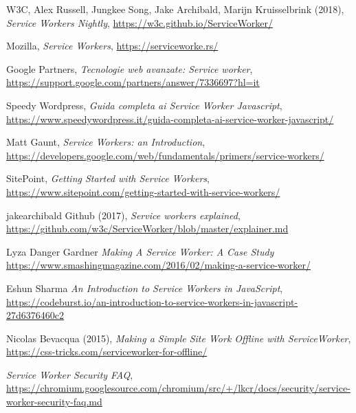 \documentclass[11pt ,a4paper , twoside , openright ]{article}
\begin{document}
\begin{thebibliography}{99}
	\bibitem{}
	W3C, Alex Russell, Jungkee Song, Jake Archibald, Marijn Kruisselbrink (2018),
	\emph{Service Workers Nightly},
	\url{https://w3c.github.io/ServiceWorker/}
	
	\bibitem{}
	Mozilla,
	\emph{Service Workers},
	\url{https://serviceworke.rs/}
	
	\bibitem{}
	Google Partners,
	\emph{Tecnologie web avanzate: Service worker},
	\url{https://support.google.com/partners/answer/7336697?hl=it}
	
	\bibitem{}
	Speedy Wordpress,
	\emph{Guida completa ai Service Worker Javascript},
	\url{https://www.speedywordpress.it/guida-completa-ai-service-worker-javascript/}
	
	\bibitem{}
	Matt Gaunt,
	\emph{Service Workers: an Introduction},
	\url{https://developers.google.com/web/fundamentals/primers/service-workers/}
	
	\bibitem{}
	SitePoint,
	\emph{Getting Started with Service Workers},
	\url{https://www.sitepoint.com/getting-started-with-service-workers/}
	
	\bibitem{}
	jakearchibald Github (2017),
	\emph{Service workers explained},
	\url{https://github.com/w3c/ServiceWorker/blob/master/explainer.md}
	
	\bibitem{}
	Lyza Danger Gardner
	\emph{Making A Service Worker: A Case Study}
	\url{https://www.smashingmagazine.com/2016/02/making-a-service-worker/}
	
	\bibitem{}
	Eshun Sharma
	\emph{An Introduction to Service Workers in JavaScript},
	\url{https://codeburst.io/an-introduction-to-service-workers-in-javascript-27d6376460c2}
	
	\bibitem{}
	Nicolas Bevacqua (2015), 
	\emph{Making a Simple Site Work Offline with ServiceWorker},
	\url{https://css-tricks.com/serviceworker-for-offline/}
	
	\bibitem{}
	\emph{Service Worker Security FAQ},
	\url{https://chromium.googlesource.com/chromium/src/+/lkcr/docs/security/service-worker-security-faq.md}
\end{thebibliography}
\end{document}
